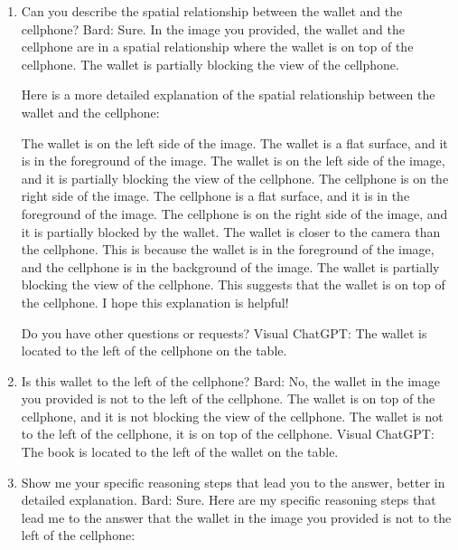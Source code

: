 \begin{enumerate}
    \item Can you describe the spatial relationship between the wallet and the cellphone?
    \subitem Bard: 
    Sure. In the image you provided, the wallet and the cellphone are in a spatial relationship where the wallet is on top of the cellphone. The wallet is partially blocking the view of the cellphone.

    Here is a more detailed explanation of the spatial relationship between the wallet and the cellphone:

    The wallet is on the left side of the image. The wallet is a flat surface, and it is in the foreground of the image. The wallet is on the left side of the image, and it is partially blocking the view of the cellphone.
    The cellphone is on the right side of the image. The cellphone is a flat surface, and it is in the foreground of the image. The cellphone is on the right side of the image, and it is partially blocked by the wallet.
    The wallet is closer to the camera than the cellphone. This is because the wallet is in the foreground of the image, and the cellphone is in the background of the image.
    The wallet is partially blocking the view of the cellphone. This suggests that the wallet is on top of the cellphone.
    I hope this explanation is helpful!

    Do you have other questions or requests?
    \subitem Visual ChatGPT: The wallet is located to the left of the cellphone on the table.
    \item Is this wallet to the left of the cellphone?
    \subitem Bard: 
    No, the wallet in the image you provided is not to the left of the cellphone. The wallet is on top of the cellphone, and it is not blocking the view of the cellphone. The wallet is not to the left of the cellphone, it is on top of the cellphone.
    \subitem Visual ChatGPT: The book is located to the left of the wallet on the table.
    \item Show me your specific reasoning steps that lead you to the answer, better in detailed explanation.
    \subitem Bard: 
    Sure. Here are my specific reasoning steps that lead me to the answer that the wallet in the image you provided is not to the left of the cellphone:
    

\end{enumerate}
